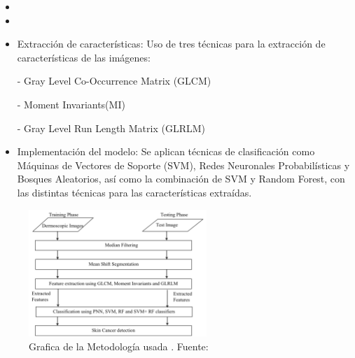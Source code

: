 \newcommand{\MEDSthree}{ Extracción de características: Uso de tres técnicas para la extracción de características de las imágenes: 
	
- Gray Level Co-Occurrence Matrix (GLCM)

- Moment Invariants(MI)

- Gray Level Run Length Matrix (GLRLM)

}
\newcommand{\MEDSfour}{Implementación del modelo: 
	Se aplican técnicas de clasificación como Máquinas de Vectores de Soporte (SVM), Redes Neuronales Probabilísticas y Bosques Aleatorios, así como la combinación de SVM y Random Forest, con las distintas técnicas para las características extraídas.
}


\begin{itemize}
	\item \MEDSone
	\item \MEDStwo
	\item \MEDSthree
	\item \MEDSfour
\end{itemize}

\begin{figure}[h]
	\begin{center}
		\includegraphics[width=0.6\textwidth]{2/figuras/Tecnica_Diagnosis_skin_cancer_imagen_02.png}
		\caption{Grafica de la Metodología usada . Fuente: \cite{murugan_2021diagnosis}}
		\label{1:fig}
	\end{center}
\end{figure}



